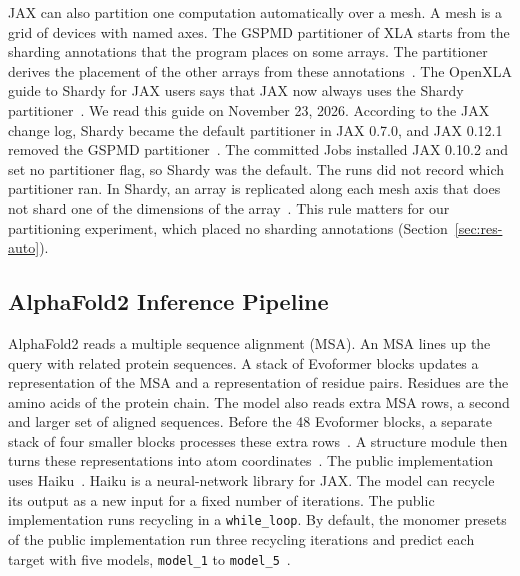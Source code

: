 JAX can also partition one computation automatically over a mesh. A mesh is a grid of devices with named axes. The
GSPMD partitioner of XLA starts from the sharding annotations that the program places on some arrays. The partitioner
derives the placement of the other arrays from these annotations~\cite{xu2021gspmd}. The OpenXLA guide to Shardy for
JAX users says that JAX now always uses the Shardy partitioner~\cite{shardy2026}.
We read this guide on November 23, 2026. %
According to the JAX change log, Shardy became the default partitioner in JAX 0.7.0, and JAX 0.12.1 removed the GSPMD partitioner~\cite{jaxchangelog}. %
The committed Jobs installed JAX 0.10.2 and set no partitioner flag, so Shardy was the default. %
The runs did not record which partitioner ran. In Shardy, an array is replicated along each mesh axis that does not
shard one of the dimensions of the array~\cite{shardyrepr}. This rule matters for our partitioning experiment, which
placed no sharding annotations (Section~\ref{sec:res-auto}).

\subsection{AlphaFold2 Inference Pipeline}\label{sec:bg-af2}
AlphaFold2 reads a multiple sequence alignment (MSA). An MSA lines up the query with related protein sequences. A
stack of Evoformer blocks updates a representation of the MSA and a representation of residue pairs. Residues are the
amino acids of the protein chain. The model also reads extra MSA rows, a second and larger set of aligned sequences.
Before the 48 Evoformer blocks, a separate stack of four smaller blocks processes these extra rows~\cite{alphafoldrepo}. %
A structure module then turns these representations into atom coordinates~\cite{jumper2021alphafold}. The public
implementation uses Haiku~\cite{haiku2020github}. Haiku is a neural-network library for JAX. The model can recycle its
output as a new input for a fixed number of iterations. The public implementation runs recycling in a
\texttt{while\_loop}. By default, the monomer presets of the public implementation run three recycling iterations and
predict each target with five models, \texttt{model\_1} to \texttt{model\_5}~\cite{alphafoldrepo}. %

